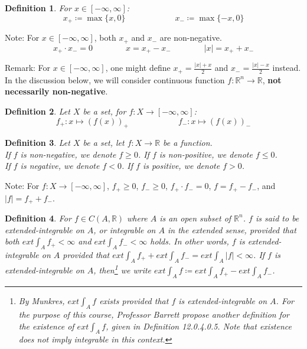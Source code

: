 \documentclass[15pt]{book}
\theoremstyle{break}
\theoremstyle{break}
\newtheorem{defn}{Definition}[corL]
\newcommand{\R}{\mathbb{R}}
\newcommand{\note}{\color{red}Note: \color{black}}
\newcommand{\remark}{\color{blue}Remark: \color{black}}
\begin{document}
\begin{defn}
For $x \in [-\infty, \infty]$: $$x_+ \coloneqq \max\{x,0\}\qquad\qquad\qquad x_- \coloneqq \max\{-x,0\}$$
\end{defn}
\note For $x\in[-\infty, \infty] $, both $x_+$ and $x_-$ are non-negative. $$x_+ \cdot x_- = 0 \qquad\qquad x = x_+ - x_- \qquad\qquad |x| = x_++x_-$$

\remark For $x\in[-\infty, \infty] $, one might define $x_+ = \frac{|x|+x}{2}$ and $x_- = \frac{|x|-x}{2}$ instead.\\

In the discussion below, we will consider continuous function $f:\R^n \to \R$, \textbf{not necessarily non-negative}.

\begin{defn}
Let $X$ be a set, for $f:X \to [-\infty, \infty]$:
$$f_+: x\mapsto(f(x))_+ \qquad\qquad\qquad f_-: x\mapsto (f(x))_-$$ 
\end{defn}

\begin{defn}
Let $X$ be a set, let $f:X \to \R$ be a function. \\
If $f$ is non-negative, we denote $f\geq 0$. If $f$ is non-positive, we denote $f\leq 0$.\\
If $f$ is negative, we denote $f< 0$. If $f$ is positive, we denote $f> 0$.
\end{defn}



\note For $f:X \to [-\infty, \infty]$,  $f_+ \geq 0$, $f_- \geq 0$, $f_+\cdot f_- = 0$, $f = f_+ - f_-$, and $|f| = f_+ + f_-$.



\begin{defn}
For $f \in C(A,\R)$ where $A$ is an open subset of $\R^n$. $f$ is said to be extended-integrable on $A$, or integrable on $A$ in the extended sense, provided that both $ext \int_A f_+< \infty$ and $ext \int_A f_- < \infty$ holds. In other words, $f$ is extended-integrable on $A$ provided that $ext \int_A f_+ + ext \int_A f_- = ext \int_A |f| < \infty$. If $f$ is extended-integrable on $A$, then\footnote{By Munkres, $ext \int_A f$ exists provided that $f$ is extended-integrable on $A$. For the purpose of this course, Professor Barrett propose another definition for the existence of $ext \int_A f$, given in Definition 12.0.4.0.5. Note that existence does not imply integrable in this context.} we write $ext \int_A f \coloneqq ext \int_A f_+ - ext \int_A f_-$. 
\end{defn}
\end{document}
